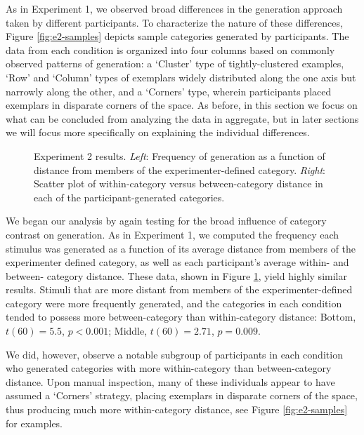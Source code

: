 \documentclass[12pt]{article}
\newcommand\inputpgf[2]{{
\let\pgfimageWithoutPath\pgfimage
\renewcommand{\pgfimage}[2][]{\pgfimageWithoutPath[##1]{#1/##2}}

}}
\begin{document}
\begin{flushleft}
As in Experiment 1, we observed broad differences in the generation approach taken by different participants.  To characterize the nature of these differences, Figure \ref{fig:e2-samples} depicts sample categories generated by participants. The data from each condition is organized into four columns based on commonly observed patterns of generation: a `Cluster' type of tightly-clustered examples,   `Row' and `Column' types of exemplars widely distributed along the one axis but narrowly along the other, and a `Corners' type, wherein participants placed exemplars in disparate corners of the space. As before, in this section we focus on what can be concluded from analyzing the data in aggregate, but in later sections we will focus more specifically on explaining the individual differences.

\begin{figure}
    \begin{center}
    \inputpgf{figs/}{e2-distanceplots.pgf}
    \caption{Experiment 2 results. {\em Left}: Frequency of generation as a function of distance from members of the experimenter-defined category. {\em Right}: Scatter plot of within-category versus between-category distance in each of the participant-generated categories.}
    \label{fig:e2-distanceplots}
    \end{center}
\end{figure}

We began our analysis by again testing for the broad influence of category contrast on generation. As in Experiment 1, we computed the frequency each stimulus was generated as a function of its average distance from members of the experimenter defined category, as well as each participant's average within- and between- category distance. These data, shown in Figure \ref{fig:e2-distanceplots}, yield highly similar results. Stimuli that are more distant from members of the experimenter-defined category were more frequently generated, and the categories in each condition tended to possess more between-category than within-category distance: Bottom, $t(60) = 5.5$, $p < 0.001$; Middle, $t(60) = 2.71$, $p = 0.009$. 

We did, however, observe a notable subgroup of participants in each condition who generated categories with more within-category than between-category distance. Upon manual inspection, many of these individuals appear to have assumed a `Corners' strategy, placing exemplars in disparate corners of the space, thus producing much more within-category distance, see Figure \ref{fig:e2-samples} for examples.


\end{flushleft}
\end{document}
